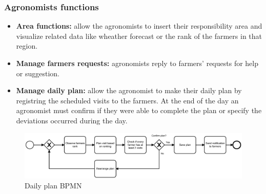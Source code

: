 \documentclass[table, 12pt]{article}
\begin{document}
\subsubsection{Agronomists functions}
\begin{itemize}
    \item \textbf{Area functions:} allow the agronomists to insert their responsibility area and visualize related data like wheather forecast or the rank of the farmers in that region.
    \item \textbf{Manage farmers requests:} agronomists reply to farmers' requests for help or suggestion.
    \item \textbf{Manage daily plan:} allow the agronomist to make their daily plan by registring the scheduled visits to the farmers. At the end of the day an agronomist must confirm if they were able to complete the plan or specify the deviations occurred during the day.   
\end{itemize}
\begin{center}
    \begin{figure}[H]
        \includegraphics[width=\textwidth]{assets/BPMN/DailyPlanBpmn}
        \caption{Daily plan BPMN}
        \label{fig: dailyplan}
    \end{figure}
\end{center}
\end{document}
